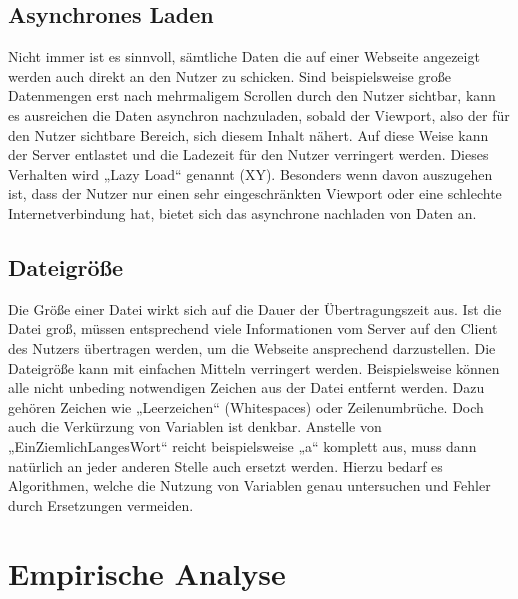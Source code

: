 \subsection{Asynchrones Laden}
\label{sec:Asynchrones Laden}
Nicht immer ist es sinnvoll, sämtliche Daten die auf einer Webseite angezeigt werden auch direkt an den Nutzer zu schicken. Sind beispielsweise große Datenmengen erst nach mehrmaligem Scrollen durch den Nutzer sichtbar, kann es ausreichen die Daten asynchron nachzuladen, sobald der Viewport, also der für den Nutzer sichtbare Bereich, sich diesem Inhalt nähert. Auf diese Weise kann der Server entlastet und die Ladezeit für den Nutzer verringert werden. Dieses Verhalten wird „Lazy Load“ genannt (XY). Besonders wenn davon auszugehen ist, dass der Nutzer nur einen sehr eingeschränkten Viewport oder eine schlechte Internetverbindung hat, bietet sich das asynchrone nachladen von Daten an.


\subsection{Dateigröße}
\label{sec:Dateigroesse}
Die Größe einer Datei wirkt sich auf die Dauer der Übertragungszeit aus. Ist die Datei groß, müssen entsprechend viele Informationen vom Server auf den Client des Nutzers übertragen werden, um die Webseite ansprechend darzustellen. Die Dateigröße kann mit einfachen Mitteln verringert werden. Beispielsweise können alle nicht unbeding notwendigen Zeichen aus der Datei entfernt werden. Dazu gehören Zeichen wie „Leerzeichen“ (Whitespaces) oder Zeilenumbrüche. Doch auch die Verkürzung von Variablen ist denkbar. Anstelle von „EinZiemlichLangesWort“ reicht beispielsweise „a“ komplett aus, muss dann natürlich an jeder anderen Stelle auch ersetzt werden. Hierzu bedarf es Algorithmen, welche die Nutzung von Variablen genau untersuchen und Fehler durch Ersetzungen vermeiden.



\section{Empirische Analyse}
\label{sec:Empirische Analyse}
